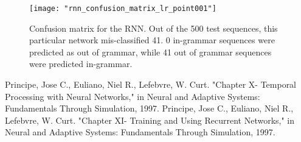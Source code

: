 \documentclass{article}[12 pt]
\begin{document}
\begin{center}
	\begin{figure}[H]
		\centering
		\texttt{[image: "rnn\_confusion\_matrix\_lr\_point001"]}
		\caption{Confusion matrix for the RNN.  Out of the 500 test sequences, this particular network mis-classified 41.  0 in-grammar sequences were predicted as out of grammar, while 41 out of grammar sequences were predicted in-grammar.}
		\label{fig:rnn_confusion_matrix_lr_point001}
	\end{figure}
\end{center}




\begin{thebibliography}{00}
	Principe, Jose C., Euliano, Niel R., Lefebvre, W. Curt. "Chapter X- Temporal Processing with Neural Networks," in Neural and Adaptive Systems: Fundamentals Through Simulation, 1997.
	Principe, Jose C., Euliano, Niel R., Lefebvre, W. Curt. "Chapter XI- Training and Using Recurrent Networks," in Neural and Adaptive Systems: Fundamentals Through Simulation, 1997.
\end{thebibliography}
\end{document}
